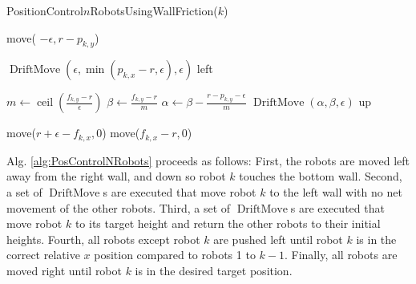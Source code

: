 \begin{algorithm}
\caption{PositionControl$n$RobotsUsingWallFriction($k$)}\label{alg:PosControlNRobots}
\begin{algorithmic}[1]
\State move( $-\epsilon, r-p_{k,y}$) %


\State $\operatorname{DriftMove}(\epsilon, \min(p_{k,x} - r,\epsilon), \epsilon)$ left   %
\EndWhile

\State $m \gets \operatorname{ceil}(\frac{f_{k,y}-r}{\epsilon})$
\State $\beta \gets \frac{f_{k,y}-r}{m}$
\State $\alpha \gets \beta - \frac{r - p_{k,y}-\epsilon}{m}$
\State $\operatorname{DriftMove}(\alpha, \beta, \epsilon)$ up   %
\EndFor

\State move($r+\epsilon-f_{k,x}, 0$)  %
\State move($f_{k,x}-r, 0$)  

\end{algorithmic}
\end{algorithm}

Alg. \ref{alg:PosControlNRobots} proceeds as follows:  
First, the robots are moved left away from the right wall, and down so robot $k$ touches the bottom wall.
Second, a set of $\operatorname{DriftMove}$s are executed that move robot $k$ to the left wall with no net movement of the other robots.
Third, a set of $\operatorname{DriftMove}$s are executed that  move robot $k$ to its target height and return the other robots to their initial heights. 
Fourth, all robots except robot $k$ are pushed left until robot $k$ is in the correct relative $x$ position compared to robots 1 to $k-1$.
Finally, all robots are moved right until robot $k$ is in the desired target position.


